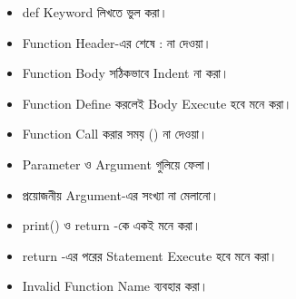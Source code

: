 


\begin{rememberbox}

\begin{itemize}

\item
\textenglish{\ttfamily def}
Keyword লিখতে ভুল করা।

\item Function Header-এর শেষে
\textenglish{\ttfamily :}
না দেওয়া।

\item Function Body সঠিকভাবে Indent না করা।

\item Function Define করলেই Body Execute হবে মনে করা।

\item Function Call করার সময়
\textenglish{\ttfamily ()}
না দেওয়া।

\item Parameter ও Argument গুলিয়ে ফেলা।

\item প্রয়োজনীয় Argument-এর সংখ্যা না মেলানো।

\item
\textenglish{\ttfamily print()}
ও
\textenglish{\ttfamily return}
-কে একই মনে করা।

\item
\textenglish{\ttfamily return}
-এর পরের Statement Execute হবে মনে করা।

\item Invalid Function Name ব্যবহার করা।

\end{itemize}

\end{rememberbox}



